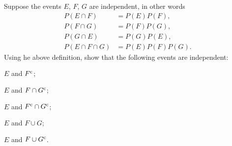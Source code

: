 \begin{problem}
  Suppose the events \(E\), \(F\), \(G\) are independent, in other words
  \begin{align*}
    P(E\cap F)&=P(E)P(F),\\
    P(F\cap G)&=P(F)P(G),\\
    P(G\cap E)&=P(G)P(E),\\
    P(E\cap F\cap G)&=P(E)P(F)P(G).
  \end{align*}
  Using he above definition, show that the following events are
  independent:
  \begin{alphlist}
  \item \(E\) and \(F^{\mathrm{c}}\);
  \item \(E\) and \(F\cap G^{\mathrm{c}}\);
  \item \(E\) and \(F^{\mathrm{c}}\cap G^{\mathrm{c}}\);
  \item \(E\) and \(F\cup G\);
  \item \(E\) and \(F\cup G^{\mathrm{c}}\).
  \end{alphlist}
\end{problem}
\begin{solution*}
\end{solution*}

